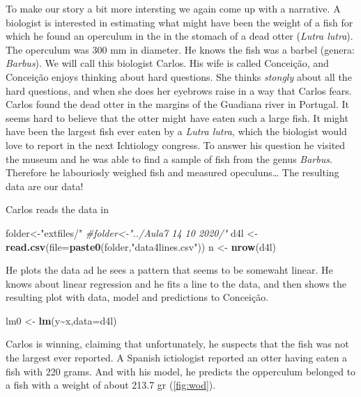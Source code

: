 \documentclass[
]{book}
\newenvironment{Shaded}{\begin{snugshade}}{\end{snugshade}}
\newcommand{\AttributeTok}[1]{\textcolor[rgb]{0.13,0.29,0.53}{#1}}
\newcommand{\CommentTok}[1]{\textcolor[rgb]{0.56,0.35,0.01}{\textit{#1}}}
\newcommand{\FunctionTok}[1]{\textcolor[rgb]{0.13,0.29,0.53}{\textbf{#1}}}
\newcommand{\NormalTok}[1]{#1}
\newcommand{\OtherTok}[1]{\textcolor[rgb]{0.56,0.35,0.01}{#1}}
\newcommand{\SpecialCharTok}[1]{\textcolor[rgb]{0.81,0.36,0.00}{\textbf{#1}}}
\newcommand{\StringTok}[1]{\textcolor[rgb]{0.31,0.60,0.02}{#1}}
\begin{document}
To make our story a bit more intersting we again come up with a narrative. A biologist is interested in estimating what might have been the weight of a fish for which he found an operculum in the in the stomach of a dead otter (\emph{Lutra lutra}). The operculum was 300 mm in diameter. He knows the fish was a barbel (genera: \emph{Barbus}). We will call this biologist Carlos. His wife is called Conceição, and Conceição enjoys thinking about hard questions. She thinks \emph{stongly} about all the hard questions, and when she does her eyebrows raise in a way that Carlos fears. Carlos found the dead otter in the margins of the Guadiana river in Portugal. It seems hard to believe that the otter might have eaten such a large fish. It might have been the largest fish ever eaten by a \emph{Lutra lutra}, which the biologist would love to report in the next Ichtiology congress. To answer his question he visited the museum and he was able to find a sample of fish from the genus \emph{Barbus}. Therefore he labouriosly weighed fish and measured opeculuns\ldots{} The resulting data are our data!

Carlos reads the data in

\begin{Shaded}
\begin{Highlighting}[]
\NormalTok{folder}\OtherTok{\textless{}{-}}\StringTok{"extfiles/"}
\CommentTok{\#folder\textless{}{-}"../Aula7 14 10 2020/"}
\NormalTok{d4l }\OtherTok{\textless{}{-}} \FunctionTok{read.csv}\NormalTok{(}\AttributeTok{file=}\FunctionTok{paste0}\NormalTok{(folder,}\StringTok{"data4lines.csv"}\NormalTok{))}
\NormalTok{n }\OtherTok{\textless{}{-}} \FunctionTok{nrow}\NormalTok{(d4l)}
\end{Highlighting}
\end{Shaded}

He plots the data ad he sees a pattern that seems to be somewaht linear. He knows about linear regression and he fits a line to the data, and then shows the resulting plot with data, model and predictions to Conceição.

\begin{Shaded}
\begin{Highlighting}[]
\NormalTok{lm0 }\OtherTok{\textless{}{-}} \FunctionTok{lm}\NormalTok{(y}\SpecialCharTok{\textasciitilde{}}\NormalTok{x,}\AttributeTok{data=}\NormalTok{d4l)}
\end{Highlighting}
\end{Shaded}

Carlos is winning, claiming that unfortunately, he suspects that the fish was not the largest ever reported. A Spanish ictiologist reported an otter having eaten a fish with 220 grams. And with his model, he predicts the opperculum belonged to a fish with a weight of about 213.7 gr (\ref{fig:wod}).
\end{document}
